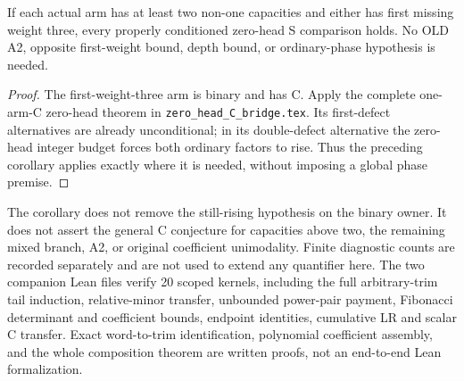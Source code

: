 \begin{corollary}
If each actual arm has at least two non-one capacities and either
has first missing weight three, every properly conditioned zero-head
S comparison holds.  No OLD A2, opposite first-weight bound, depth
bound, or ordinary-phase hypothesis is needed.
\end{corollary}
\begin{proof}
The first-weight-three arm is binary and has C.  Apply the complete
one-arm-C zero-head theorem in \texttt{zero\_head\_C\_bridge.tex}.
Its first-defect alternatives are already unconditional; in its
double-defect alternative the zero-head integer budget forces both
ordinary factors to rise.  Thus the preceding corollary applies
exactly where it is needed, without imposing a global phase premise.
\end{proof}

The corollary does not remove the still-rising hypothesis on the
binary owner.  It does not assert the general C conjecture for
capacities above two, the remaining mixed branch, A2, or original
coefficient unimodality.  Finite diagnostic counts are recorded
separately and are not used to extend any quantifier here.  The two
companion Lean files verify 20 scoped kernels, including the full
arbitrary-trim tail induction, relative-minor transfer, unbounded
power-pair payment, Fibonacci determinant and coefficient bounds,
endpoint identities, cumulative LR and scalar C transfer.  Exact
word-to-trim identification, polynomial coefficient assembly, and
the whole composition theorem are written proofs, not an end-to-end
Lean formalization.
